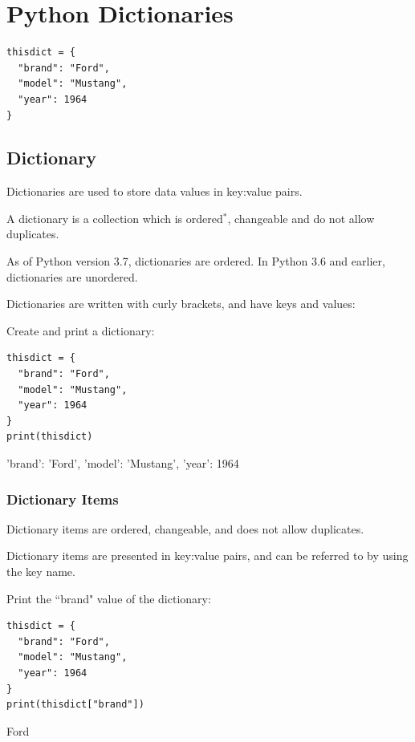 \documentclass[12pt,a4paper]{article}
\begin{document}
\section{Python Dictionaries}\label{pyDictionary}

\begin{lstlisting}
thisdict = {
  "brand": "Ford",
  "model": "Mustang",
  "year": 1964
}
\end{lstlisting}

\subsection{Dictionary}

Dictionaries are used to store data values in key:value pairs.

A dictionary is a collection which is ordered$^*$, changeable and do not allow
duplicates.

\begin{nbox}
As of Python version 3.7, dictionaries are ordered. In Python 3.6 and earlier,
dictionaries are unordered.
\end{nbox}

Dictionaries are written with curly brackets, and have keys and values:

\begin{ebox}
Create and print a dictionary:
	\begin{lstlisting}
thisdict = {
  "brand": "Ford",
  "model": "Mustang",
  "year": 1964
}
print(thisdict)
	\end{lstlisting}
\tcblower
	\begin{vercode}
{'brand': 'Ford', 'model': 'Mustang', 'year': 1964}
	\end{vercode}
\end{ebox}

\subsubsection{Dictionary Items}

Dictionary items are ordered, changeable, and does not allow duplicates.

Dictionary items are presented in key:value pairs, and can be referred to by
using the key name.

\begin{ebox}
Print the ``brand" value of the dictionary:
	\begin{lstlisting}
thisdict = {
  "brand": "Ford",
  "model": "Mustang",
  "year": 1964
}
print(thisdict["brand"])
	\end{lstlisting}
\tcblower
	\begin{vercode}
Ford
	\end{vercode}
\end{ebox}
\end{document}
